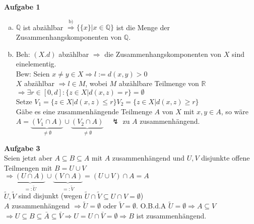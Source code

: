 \documentclass{article}
\begin{document}
\textbf{Aufgabe 1}
\begin{enumerate}[a)]
\item $\mathbb{Q}$ ist abzählbar $\stackrel{\text{b)}}{\Rightarrow} \big\{\{x\}|x\in\mathbb{Q}\big\}$ ist die Menge der Zusammenhangskomponenten von $\mathbb{Q}$.
\item Beh: $(X.d)$ abzählbar $\Rightarrow$ die Zusammenhangskomponenten von $X$ sind einelementig.\\
Bew: Seien $x\neq y\in X\Rightarrow l:=d(x,y)>0$\\
$X$ abzählbar $\Rightarrow l\in M$, wobei $M$ abzählbare Teilmenge von $\mathbb{R}$\\
$\Rightarrow\exists r\in[0,d]:\{z\in X|d(x,z) = r\} = \emptyset$\\
Setze $V_1 = \{z\in X|d(x,z) \leq r\} V_2 = \{z\in X|d(x,z) \geq r\}$\\
Gäbe es eine zusammenhängende Teilmenge $A$ von $X$ mit $x,y\in A$, so wäre $A=\underbrace{(V_1\cap A)}_{\neq\emptyset}\cup\underbrace{(V_2\cap A)}_{\neq\emptyset}\quad\lightning$ zu $A$ zusammenhängend.
\end{enumerate}

\textbf{Aufgabe 3}\\
Seien jetzt aber $A\subseteq B\subseteq A$ mit $A$ zusammenhängend und $U,V$ disjunkte offene Teilmengen mit $B=U\cup V$\\
$\Rightarrow\underbrace{(U\cap A)}_{=:\tilde U}\cup\underbrace{(V\cap A)}_{=:\tilde{V}} = (U\cup V)\cap A = A$\\
$\tilde{U},\tilde{V}$ sind disjunkt (wegen $\tilde{U}\cap\tilde{V}\subseteq U\cap V = \emptyset$)\\
$A$ zusammenhängend $\Rightarrow \tilde{U}=\emptyset$ oder $\tilde{V}=\emptyset$. O.B.d.A $\tilde{U}=\emptyset\Rightarrow A\subseteq V$\\
$\Rightarrow U\subseteq B\subseteq \bar{A}\subseteq\bar{V}\Rightarrow U=U\cap\bar{V} = \emptyset\Rightarrow B$ ist zusammenhängend.
\end{document}
